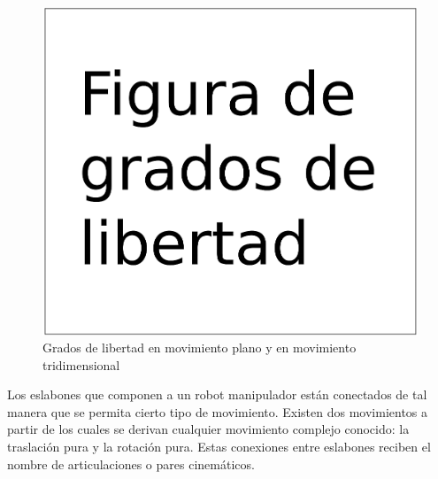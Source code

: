 \begin{figure}
	\centering
	\includegraphics[scale=0.1]{Capitulo2/figs/GDLs.png}      %
	\caption{Grados de libertad en movimiento plano y en movimiento tridimensional}            %
	\label{figGDL}                            %
\end{figure}

Los eslabones que componen a un robot manipulador están conectados de tal manera
que se permita cierto tipo de movimiento. Existen dos movimientos a partir de los cuales se derivan cualquier movimiento complejo conocido: la traslación pura y la rotación
pura.
Estas conexiones entre eslabones reciben el nombre de articulaciones o pares cinemáticos.

